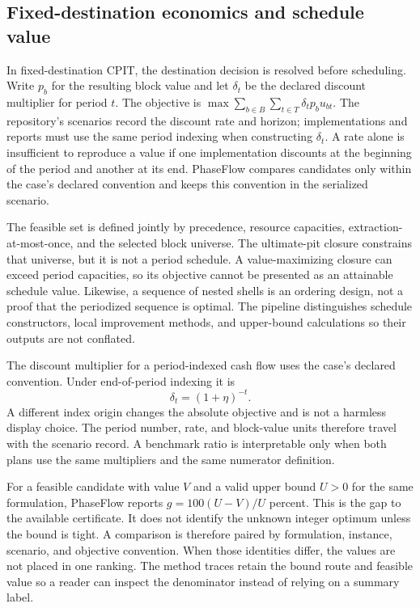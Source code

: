 \subsection{Fixed-destination economics and schedule value}
In fixed-destination CPIT, the destination decision is resolved before scheduling. Write $p_b$ for the resulting block value and let $\delta_t$ be the declared discount multiplier for period $t$. The objective is $\max \sum_{b\in B}\sum_{t\in T}\delta_t p_b u_{bt}$. The repository's scenarios record the discount rate and horizon; implementations and reports must use the same period indexing when constructing $\delta_t$. A rate alone is insufficient to reproduce a value if one implementation discounts at the beginning of the period and another at its end. PhaseFlow compares candidates only within the case's declared convention and keeps this convention in the serialized scenario.

The feasible set is defined jointly by precedence, resource capacities, extraction-at-most-once, and the selected block universe. The ultimate-pit closure constrains that universe, but it is not a period schedule. A value-maximizing closure can exceed period capacities, so its objective cannot be presented as an attainable schedule value. Likewise, a sequence of nested shells is an ordering design, not a proof that the periodized sequence is optimal. The pipeline distinguishes schedule constructors, local improvement methods, and upper-bound calculations so their outputs are not conflated.

The discount multiplier for a period-indexed cash flow uses the case's declared convention. Under end-of-period indexing it is
\begin{equation}
 \delta_t=(1+\eta)^{-t}.
\end{equation}
A different index origin changes the absolute objective and is not a harmless display choice. The period number, rate, and block-value units therefore travel with the scenario record. A benchmark ratio is interpretable only when both plans use the same multipliers and the same numerator definition.

For a feasible candidate with value $V$ and a valid upper bound $U>0$ for the same formulation, PhaseFlow reports $g=100(U-V)/U$ percent. This is the gap to the available certificate. It does not identify the unknown integer optimum unless the bound is tight. A comparison is therefore paired by formulation, instance, scenario, and objective convention. When those identities differ, the values are not placed in one ranking. The method traces retain the bound route and feasible value so a reader can inspect the denominator instead of relying on a summary label.

